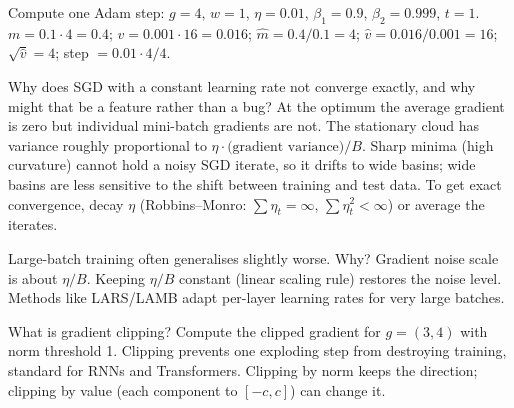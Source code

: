 \begin{qa}{Compute one Adam step: $g = 4$, $w = 1$, $\eta = 0.01$, $\beta_1=0.9$, $\beta_2=0.999$, $t = 1$.}
\why $m = 0.1\cdot4 = 0.4$; $v = 0.001\cdot16 = 0.016$; $\hat m = 0.4/0.1 = 4$; $\hat v = 0.016/0.001 = 16$; $\sqrt{\hat v} = 4$;
step $= 0.01\cdot4/4$.
\end{qa}

\begin{qa}{\deep Why does SGD with a constant learning rate not converge exactly, and why might that be a feature rather than
a bug?}
\why At the optimum the average gradient is zero but individual mini-batch gradients are not. The stationary cloud has
variance roughly proportional to $\eta\cdot\text{(gradient variance)}/B$. Sharp minima (high curvature) cannot hold a
noisy SGD iterate, so it drifts to wide basins; wide basins are less sensitive to the shift between training and test
data. To get exact convergence, decay $\eta$ (Robbins--Monro: $\sum\eta_t = \infty$, $\sum\eta_t^2 < \infty$) or average
the iterates.
\end{qa}

\begin{qa}{\deep Large-batch training often generalises slightly worse. Why?}
\why Gradient noise scale is about $\eta/B$. Keeping $\eta/B$ constant (linear scaling rule) restores the noise level.
Methods like LARS/LAMB adapt per-layer learning rates for very large batches.
\end{qa}

\begin{qa}{What is gradient clipping? Compute the clipped gradient for $g = (3, 4)$ with norm threshold 1.}
\why Clipping prevents one exploding step from destroying training, standard for RNNs and Transformers. Clipping by norm
keeps the direction; clipping by value (each component to $[-c, c]$) can change it.
\end{qa}

